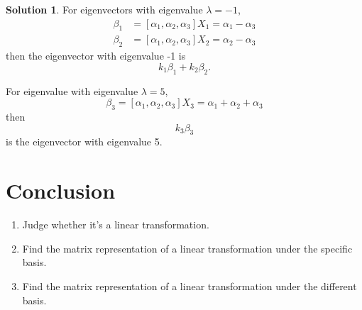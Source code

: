 \documentclass{article}
\theoremstyle{definition}
\newtheorem{sol}{Solution}[exe]
\begin{document}
\begin{sol}
    For eigenvectors with eigenvalue $\lambda=-1$,
    \begin{align*}
        \beta_{1}&=[\alpha_{1},\alpha_{2},\alpha_{3}]X_{1}=\alpha_{1}-\alpha_{3}\\
        \beta_{2}&=[\alpha_{1},\alpha_{2},\alpha_{3}]X_{2}=\alpha_{2}-\alpha_{3}
    \end{align*}
    then the eigenvector with eigenvalue -1 is 
    $$k_{1}\beta_{1}+k_{2}\beta_{2}.$$
    
    For eigenvalue with eigenvalue $\lambda=5$,
    $$\beta_{3}=[\alpha_{1},\alpha_{2},\alpha_{3}]X_{3}=\alpha_{1}+\alpha_{2}+\alpha_{3}$$
    then $$k_{3}\beta_{3}$$ is the eigenvector with eigenvalue 5.
\end{sol}


\section{Conclusion}
\begin{enumerate}
    \item Judge whether it's a linear transformation.
    \item Find the matrix representation of a linear transformation under the specific basis.
    \item Find the matrix representation of a linear transformation under the different basis.
\end{enumerate}
\end{document}
